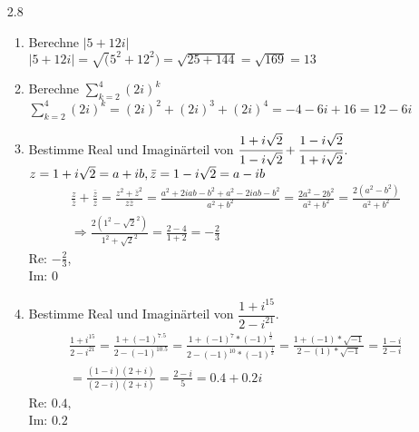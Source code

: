 \documentclass[12pt,letterpaper]{article}
\begin{document}
\begin{enumerate}
\begin{enumerate}
\end{enumerate}
\item [2.8]
\begin{enumerate}
\item Berechne $|5+12i|$\\
$|5+12i| = \sqrt(5^2+12^2) = \sqrt{25+144} = \sqrt{169} = 13$
\item Berechne $\sum\limits_{k=2}^{4}(2i)^k$\\
$\sum\limits_{k=2}^{4}(2i)^k = (2i)^2+(2i)^3+(2i)^4 = -4-6i+16 = 12-6i$
\item Bestimme Real und Imaginärteil von $\cfrac{1+i\sqrt{2}}{1-i\sqrt{2}}+\cfrac{1-i\sqrt{2}}{1+i\sqrt{2}}$.\\
$z = 1+i\sqrt{2} = a+ib,\\
\bar{z} = 1-i\sqrt{2} = a-ib$
\begin{align*}
\frac{z}{\bar{z}}+\frac{\bar{z}}{z} = \frac{z^2+\bar{z}^2}{z\bar{z}} = \frac{a^2+2iab-b^2+a^2-2iab-b^2}{a^2+b^2} = \frac{2a^2-2b^2}{a^2+b^2} = \frac{2(a^2-b^2)}{a^2+b^2}\\
\Rightarrow\frac{2(1^2-\sqrt{2}^2)}{1^2+\sqrt{2}^2}=\frac{2-4}{1+2} = -\frac{2}{3}
\end{align*}
Re: $-\frac{2}{3}$,\\
Im: $0$
\item Bestimme Real und Imaginärteil von $\dfrac{1+i^{15}}{2-i^{21}}$.
\begin{align*}
\frac{1+i^{15}}{2-i^{21}} = \frac{1+(-1)^{7.5}}{2-(-1)^{10.5}} = \frac{1+(-1)^7*(-1)^{\frac{1}{2}}}{2-(-1)^{10}*(-1)^{\frac{1}{2}}} = \frac{1+(-1)*\sqrt{-1}}{2-(1)*\sqrt{-1}} = \frac{1-i}{2-i}\\
=\frac{(1-i)(2+i)}{(2-i)(2+i)} = \frac{2-i}{5} = 0.4+0.2i
\end{align*}
Re: $0.4$,\\
Im: $0.2$
\end{enumerate}
\end{enumerate}
\end{document}
